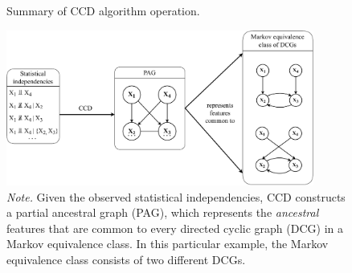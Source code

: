 \documentclass[twoside, 11pt]{article}
\begin{document}


\vspace{5mm}
\begin{figure}[H]
    \centering
        \caption{Summary of CCD algorithm operation.}
        \includegraphics[width=0.9\textwidth]{figures/Fig4.pdf}
        \vspace{3mm}
        \caption*{\small{\textit{Note.} Given the observed statistical independencies, CCD constructs a partial ancestral graph (PAG), which represents the \textit{ancestral} features that are common to every directed cyclic graph (DCG) in a Markov equivalence class. In this particular example, the Markov equivalence class consists of two different DCGs.}}
    \label{fig:4}
\end{figure}
\end{document}
